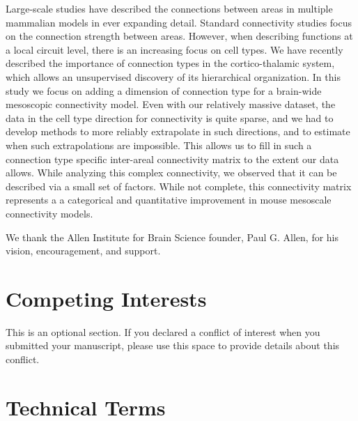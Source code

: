 \documentclass[NETN,manuscript]{stjour-new}
\begin{document}
\begin{authorsummary}
Large-scale studies have described the connections between areas in multiple mammalian models in ever expanding detail.
Standard connectivity studies focus on the connection strength between areas.
However, when describing functions at a local circuit level, there is an increasing focus on cell types.
We have recently described the importance of connection types in the cortico-thalamic system, which allows an unsupervised discovery of its hierarchical organization.
In this study we focus on adding a dimension of connection type for a brain-wide mesoscopic connectivity model.
Even with our relatively massive dataset, the data in the cell type direction for connectivity is quite sparse, and we had to develop methods to more reliably extrapolate in such directions, and to estimate when such extrapolations are impossible.
This allows us to fill in such a connection type specific inter-areal connectivity matrix to the extent our data allows. 
While analyzing this complex connectivity, we observed that it can be described via a small set of factors. 
While not complete, this connectivity matrix represents a a categorical and quantitative improvement in mouse mesoscale connectivity models. 

\end{authorsummary}

\newpage


\newpage

\newpage

\newpage


\newpage

\acknowledgments
We thank the Allen Institute for Brain Science founder, Paul G. Allen, for his vision, encouragement, and support.
\newpage


\newpage
\section{Competing Interests}
\label{sec:comp}
This is an optional section. If you declared a conflict of interest when you submitted your manuscript, please  use this space to provide details about this conflict.

\newpage


\newpage
\section{Technical Terms}
\end{document}
